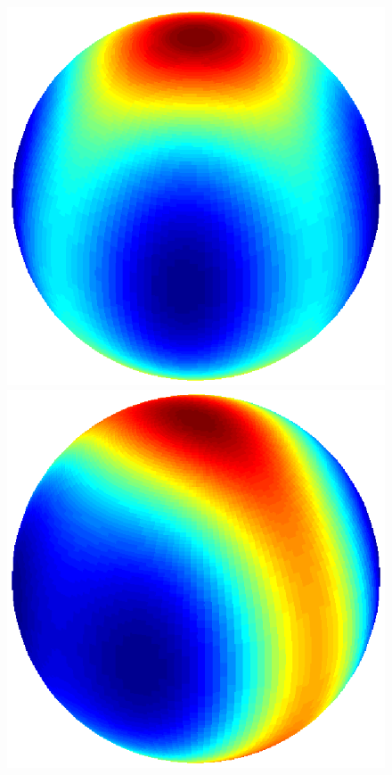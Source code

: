 \documentclass[dvips,aoas,preprint]{imsart}
\numberwithin{equation}{section}
\theoremstyle{plain}
\begin{document}
\begin{figure}[!htbp]
\begin{minipage}[]{0.12\textwidth}
    \end{minipage}
    \begin{minipage}[]{0.12\textwidth}
      \centering
      \includegraphics*[width=\textwidth]{figure4c1.eps}
    \end{minipage}
    \begin{minipage}[]{0.12\textwidth}
      \centering
      \includegraphics*[width=\textwidth]{figure4b1.eps}

\end{minipage}
\end{figure}
\end{document}
